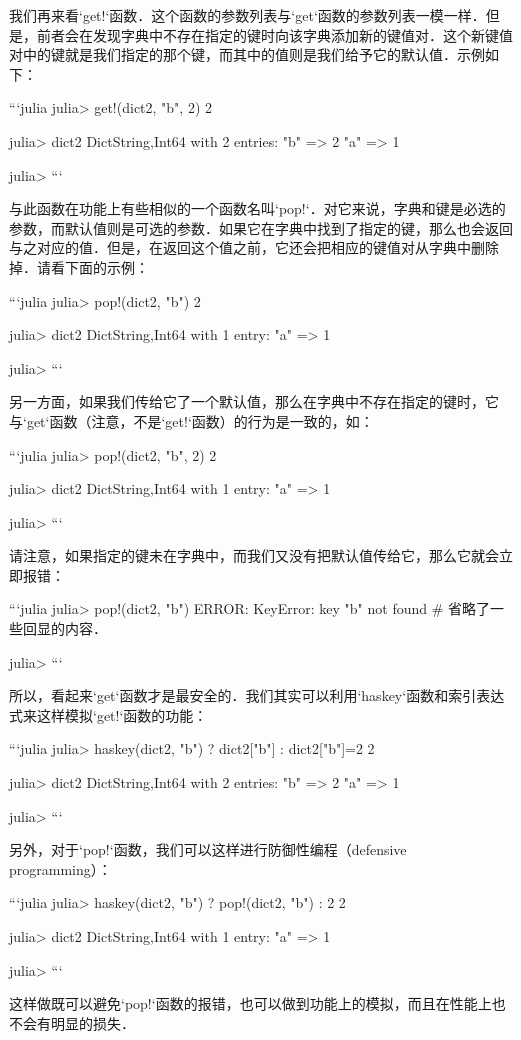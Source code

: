 我们再来看`get!`函数．这个函数的参数列表与`get`函数的参数列表一模一样．但是，前者会在发现字典中不存在指定的键时向该字典添加新的键值对．这个新键值对中的键就是我们指定的那个键，而其中的值则是我们给予它的默认值．示例如下：

```julia
julia> get!(dict2, "b", 2)
2

julia> dict2
Dict{String,Int64} with 2 entries:
  "b" => 2
  "a" => 1

julia> 
```

与此函数在功能上有些相似的一个函数名叫`pop!`．对它来说，字典和键是必选的参数，而默认值则是可选的参数．如果它在字典中找到了指定的键，那么也会返回与之对应的值．但是，在返回这个值之前，它还会把相应的键值对从字典中删除掉．请看下面的示例：

```julia
julia> pop!(dict2, "b")
2

julia> dict2
Dict{String,Int64} with 1 entry:
  "a" => 1

julia> 
```

另一方面，如果我们传给它了一个默认值，那么在字典中不存在指定的键时，它与`get`函数（注意，不是`get!`函数）的行为是一致的，如：

```julia
julia> pop!(dict2, "b", 2)
2

julia> dict2
Dict{String,Int64} with 1 entry:
  "a" => 1

julia> 
```

请注意，如果指定的键未在字典中，而我们又没有把默认值传给它，那么它就会立即报错：

```julia
julia> pop!(dict2, "b")
ERROR: KeyError: key "b" not found
# 省略了一些回显的内容．

julia> 
```

所以，看起来`get`函数才是最安全的．我们其实可以利用`haskey`函数和索引表达式来这样模拟`get!`函数的功能：

```julia
julia> haskey(dict2, "b") ? dict2["b"] : dict2["b"]=2
2

julia> dict2
Dict{String,Int64} with 2 entries:
  "b" => 2
  "a" => 1

julia> 
```

另外，对于`pop!`函数，我们可以这样进行防御性编程（defensive programming）：

```julia
julia> haskey(dict2, "b") ? pop!(dict2, "b") : 2
2

julia> dict2
Dict{String,Int64} with 1 entry:
  "a" => 1

julia> 
```

这样做既可以避免`pop!`函数的报错，也可以做到功能上的模拟，而且在性能上也不会有明显的损失．

